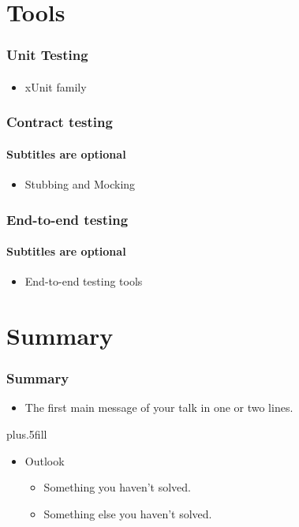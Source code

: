\documentclass{beamer}
\begin{document}
\section{Tools}
\begin{frame}
	\frametitle{Unit Testing}
	\framesubtitle{}

	\begin{itemize}
 		 \item xUnit family 
	\end{itemize}
\end{frame}

\begin{frame}
	\frametitle{Contract testing}
	\framesubtitle{Subtitles are optional}

	\begin{itemize}
 		 \item Stubbing and Mocking
	\end{itemize}
\end{frame}

\begin{frame}
	\frametitle{End-to-end testing}
	\framesubtitle{Subtitles are optional}
	\begin{itemize}
 		 \item End-to-end testing tools
	\end{itemize}
\end{frame}

\section*{Summary}

\begin{frame}
\frametitle<presentation>{Summary}

\begin{itemize}
  \item The \alert{first main message} of your talk in one or two lines.
\end{itemize}

\vskip0pt plus.5fill
\begin{itemize}
  \item Outlook
  \begin{itemize}
    \item Something you haven't solved.
    \item Something else you haven't solved.
  \end{itemize}
\end{itemize}
\end{frame}
\end{document}
